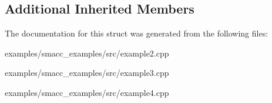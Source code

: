 \subsection*{Additional Inherited Members}


The documentation for this struct was generated from the following files\+:\begin{DoxyCompactItemize}
\item 
examples/smacc\+\_\+examples/src/example2.\+cpp\item 
examples/smacc\+\_\+examples/src/example3.\+cpp\item 
examples/smacc\+\_\+examples/src/example4.\+cpp\end{DoxyCompactItemize}
